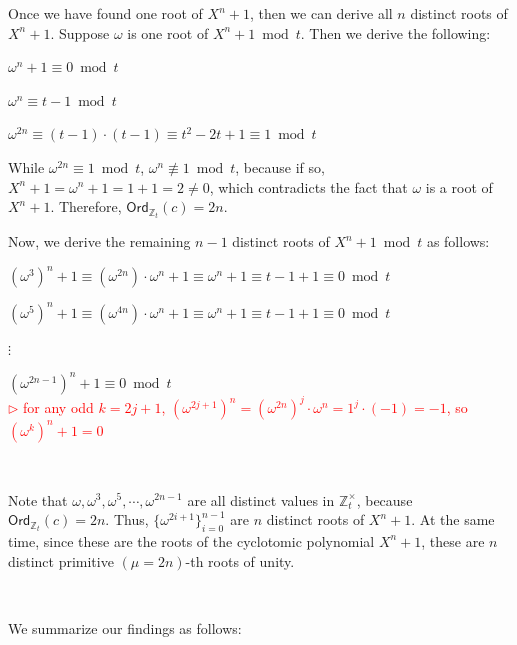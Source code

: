 Once we have found one root of $X^n + 1$, then we can derive all $n$ distinct roots of $X^n + 1$. Suppose $\omega$ is one root of $X^n + 1 \bmod t$. Then we derive the following:

$\omega^n + 1 \equiv 0 \bmod t$

$\omega^n \equiv t - 1 \bmod t$

$\omega^{2n} \equiv (t - 1)\cdot(t - 1) \equiv  t^2 - 2t + 1 \equiv   1 \bmod t$

While $\omega^{2n} \equiv 1 \bmod t$, $\omega^{n} \not\equiv 1 \bmod t$, because if so, $X^n + 1 = \omega^n + 1 = 1 + 1 = 2 \neq 0$, which contradicts the fact that $\omega$ is a root of $X^n + 1$. Therefore, $\textsf{Ord}_{\mathbb{Z}_t}(c) = 2n$. 

Now, we derive the remaining $n-1$ distinct roots of $X^n + 1 \bmod t$ as follows:

$(\omega^3)^n + 1 \equiv (\omega^{2n})\cdot \omega^n + 1 \equiv \omega^n + 1 \equiv t - 1 + 1 \equiv 0 \bmod t$

$(\omega^5)^n + 1 \equiv (\omega^{4n})\cdot \omega^n + 1 \equiv \omega^n + 1 \equiv t - 1 + 1 \equiv 0 \bmod t$

$\vdots$

$(\omega^{2n - 1})^n + 1 \equiv 0 \bmod t$ \\ \textcolor{red}{ $\rhd$ for any odd $k = 2j+1$, $(\omega^{2j+1})^n = (\omega^{2n})^j \cdot \omega^n = 1^j \cdot (-1) = -1$, so $(\omega^k)^n + 1 = 0$}

$ $

Note that $\omega, \omega^3, \omega^5, \cdots, \omega^{2n - 1}$ are all distinct values in $\mathbb{Z}_t^{\times}$, because $\textsf{Ord}_{\mathbb{Z}_t}(c) = 2n$. Thus, $\{\omega^{2i + 1}\}_{i=0}^{n-1}$ are $n$ distinct roots of $X^n + 1$. At the same time, since these are the roots of the cyclotomic polynomial $X^n + 1$, these are $n$ distinct primitive $(\mu=2n)$-th roots of unity. 


$ $


We summarize our findings as follows:

